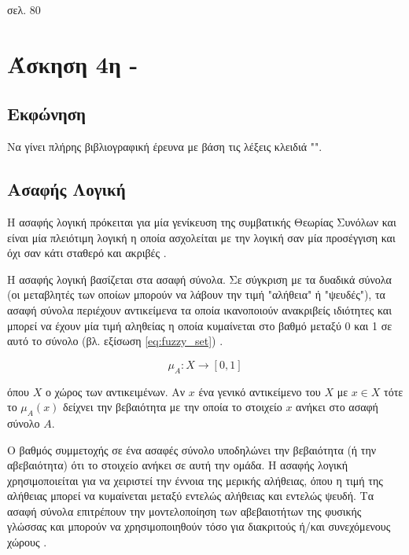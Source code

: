 \documentclass{assignment}
\begin{document}
σελ. 80

\section{Άσκηση 4η - }
\subsection{Εκφώνηση}

Να γίνει πλήρης βιβλιογραφική έρευνα με βάση τις λέξεις κλειδιά "".

\subsection {Ασαφής Λογική}

Η ασαφής λογική πρόκειται για μία γενίκευση της συμβατικής Θεωρίας Συνόλων και είναι μία πλειότιμη λογική η οποία ασχολείται με την λογική σαν μία προσέγγιση και όχι σαν κάτι σταθερό και ακριβές \cite{engelbrecht,class_notes,wiki:fuzzy_logic,zadeh1994}. %

Η ασαφής λογική βασίζεται στα ασαφή σύνολα. Σε σύγκριση με τα δυαδικά σύνολα (οι μεταβλητές των οποίων μπορούν να λάβουν την τιμή "αλήθεια" ή "ψευδές"), τα ασαφή σύνολα περιέχουν αντικείμενα τα οποία ικανοποιούν ανακριβείς ιδιότητες και μπορεί να έχουν μία τιμή αληθείας η οποία κυμαίνεται στο βαθμό μεταξύ 0 και 1 σε αυτό το σύνολο (βλ. εξίσωση \eqref{eq:fuzzy_set}) \cite{zadeh1965338}. 

\begin{equation}
\mu_A : X \rightarrow [0,1]
\label{eq:fuzzy_set}
\end{equation}

όπου $X$ ο χώρος των αντικειμένων. Αν $x$ ένα γενικό αντικείμενο του $X$ με $x \in X$ τότε το $\mu_A(x)$ δείχνει την βεβαιότητα με την οποία το στοιχείο $x$ ανήκει στο ασαφή σύνολο $A$.

Ο βαθμός συμμετοχής σε ένα ασαφές σύνολο υποδηλώνει την βεβαιότητα (ή την αβεβαιότητα) ότι το στοιχείο ανήκει σε αυτή την ομάδα. Η ασαφής λογική χρησιμοποιείται για να χειριστεί την έννοια της μερικής αλήθειας, όπου η τιμή της αλήθειας μπορεί να κυμαίνεται μεταξύ εντελώς αλήθειας και εντελώς ψευδή. Τα ασαφή σύνολα επιτρέπουν την μοντελοποίηση των αβεβαιοτήτων της φυσικής γλώσσας και μπορούν να χρησιμοποιηθούν τόσο για διακριτούς ή/και συνεχόμενους χώρους \cite{engelbrecht,class_notes,wiki:fuzzy_logic}. 
\end{document}
